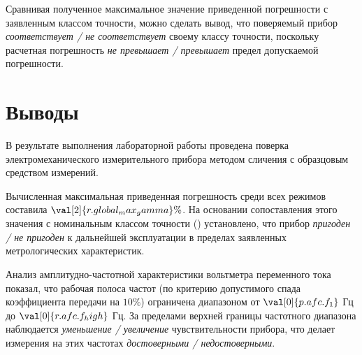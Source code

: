 Сравнивая полученное максимальное значение приведенной погрешности с заявленным классом точности, можно сделать вывод, что поверяемый прибор \textit{соответствует / не соответствует} своему классу точности, поскольку расчетная погрешность \textit{не превышает / превышает} предел допускаемой погрешности.

 
\section*{Выводы} 

В результате выполнения лабораторной работы проведена поверка электромеханического измерительного прибора методом сличения с образцовым средством измерений.

Вычисленная максимальная приведенная погрешность среди всех режимов составила $\val[2]{r.global_max_gamma} \%$. На основании сопоставления этого значения с номинальным классом точности (\underline{\hspace{2cm}}) установлено, что прибор \textit{пригоден / не пригоден} к дальнейшей эксплуатации в пределах заявленных метрологических характеристик.

Анализ амплитудно-частотной характеристики вольтметра переменного тока показал, что рабочая полоса частот (по критерию допустимого спада коэффициента передачи на $10\%$) ограничена диапазоном от $\val[0]{p.afc.f_1}$ Гц до $\val[0]{r.afc.f_high}$ Гц. За пределами верхней границы частотного диапазона наблюдается \textit{уменьшение / увеличение} чувствительности прибора, что делает измерения на этих частотах \textit{достоверными / недостоверными}.